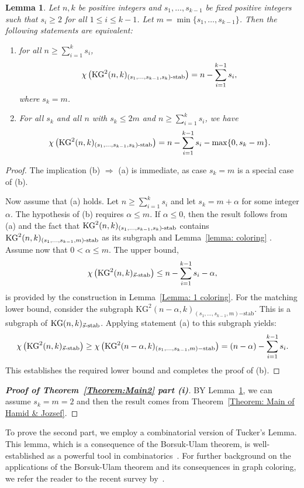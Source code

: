 \documentclass[preprint,12pt,3p]{elsarticle}
\newtheorem{lemma}[theorem]{Lemma}
\begin{document}
\begin{lemma}\label{Lemma:equivalence}
Let $n, k$ be positive integers and $s_1, \ldots, s_{k-1}$ be fixed positive integers such that $s_i \geq 2$ for all $1 \leq i \leq k-1$. Let $m = \min\{s_1, \ldots, s_{k-1}\}$. Then the following statements are equivalent:
\begin{enumerate}
    \item[(a)] for all $n \geq \sum_{i=1}^{k} s_i$,
    \[
    \chi\left(\mathrm{KG}^{2}(n, k)_{(s_1,\ldots, s_{k-1}, s_k)\textup{-stab}}\right) = n - \sum_{i=1}^{k-1} s_i,
    \]
    where $s_k=m$.
    \item[(b)] For all $s_k$ and all $n$ with $s_k \leq 2m$ and $n \geq \sum_{i=1}^{k} s_i$, we have
    \[
    \chi\left(\mathrm{KG}^{2}(n, k)_{(s_1,\ldots, s_{k-1}, s_k)\textup{-stab}}\right) = n - \sum_{i=1}^{k-1} s_i - \max\{0, s_k - m\}.
    \]
\end{enumerate}
\end{lemma}

\begin{proof}
The implication (b) $\Rightarrow$ (a) is immediate, as case $s_k = m$ is a special case of (b).

Now assume that (a) holds. Let $n \geq \sum_{i=1}^{k} s_i$ and let $s_k = m + \alpha$ for some integer $\alpha$. The hypothesis of (b) requires $\alpha \leq m$.
If $\alpha \leq 0$, then the result follows from (a) and the fact that $\mathrm{KG}^{2}(n, k)_{(s_1,\ldots, s_{k-1}, s_k)\textup{-stab}}$ contains $\mathrm{KG}^{2}(n, k)_{(s_1,\ldots, s_{k-1}, m)\textup{-stab}}$ as its subgraph and Lemma~\ref{lemma: coloring} . Assume now that $0 < \alpha \leq m$. The upper bound,
\[
\chi\left(\mathrm{KG}^{2}(n, k)_{\vec{s}\textup{-stab}}\right) \leq n - \sum_{i=1}^{k-1} s_i - \alpha,
\]
is provided by the construction in Lemma~\ref{Lemma: 1 coloring}. For the matching lower bound, consider the subgraph $\mathrm{KG}^{2}(n-\alpha, k)_{(s_1,\ldots, s_{k-1}, m)\mathrm{-stab}}$. This is a subgraph of $\mathrm{KG}(n, k)_{\vec{s}\textup{-stab}}$. Applying statement (a) to this subgraph yields:
\[
\chi\left(\mathrm{KG}^{2}(n, k)_{\vec{s}\textup{-stab}}\right) \geq \chi\left(\mathrm{KG}^{2}(n-\alpha, k)_{(s_1,\ldots, s_{k-1}, m)\mathrm{-stab}}\right) = (n-\alpha) - \sum_{i=1}^{k-1} s_i.
\]
This establishes the required lower bound and completes the proof of (b).
\end{proof}



\begin{proof}[\textbf{Proof of Theorem~\ref{Theorem:Main2} part (i)}]
BY Lemma~\ref{Lemma:equivalence}, we can assume $s_k=m=2$ and then the result comes from Theorem~\ref{Theorem: Main of Hamid & Jozsef}.
\end{proof}
To prove the second part, we employ a combinatorial version of Tucker's Lemma\cite{matousek2004}. This lemma, which is a consequence of the Borsuk-Ulam theorem, is well-established as a powerful tool in combinatorics~\cite{matousek2004, palvolgyi2009, daneshpajouh2018new}. For further background on the applications of the Borsuk-Ulam theorem and its consequences in graph coloring, we refer the reader to the recent survey by~\cite{daneshpajouh2025box}.
\end{document}

